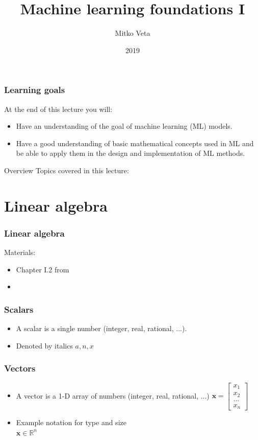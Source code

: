 \documentclass[notes]{beamer}          %
\title{Machine learning foundations I}
\author{Mitko Veta}
\institute{Eindhoven University of Technology

Department of Biomedical Engineering}
\date{2019}
\newcommand{\vect}[1]{\bm{#1}}
\newcommand{\field}[1]{\mathbb{#1}}
\newcommand{\R}{\field{R}}
\begin{document}
\frame{\titlepage}


\begin{frame}
\frametitle{Learning goals}

At the end of this lecture you will:
\begin{itemize}
    \item Have an understanding of the goal of machine learning (ML) models.
    \item Have a good understanding of basic mathematical concepts used in ML and be able to apply them in the design and implementation of ML methods.
\end{itemize}
\end{frame}

\begin{frame}{Overview}
Topics covered in this lecture:
    \tableofcontents
\end{frame}

\section{Linear algebra}

\begin{frame}
\frametitle{Linear algebra}
Materials:
\begin{itemize}
    \item Chapter I.2 from \cite{deeplearning}
    \item \cite{linearalgebra}
\end{itemize}

\end{frame}

\begin{frame}
\frametitle{Scalars}
\begin{itemize}
    \item A scalar is a single number (integer, real, rational, ...).
    \item Denoted by italics $a, n, x$

\end{itemize}
\end{frame}

\begin{frame}
\frametitle{Vectors}
\begin{itemize}
    \item A vector is a 1-D array of numbers (integer, real, rational, ...)
    $
    \vect{x} = \begin{bmatrix} x_1 \\ x_2 \\ \ldots \\ x_n \end{bmatrix}
    $
    \item{Example notation for type and size} \\
    $\vect{x} \in \R^n$
 \end{itemize}
\end{frame}
\end{document}
